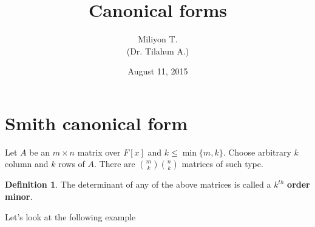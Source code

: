 \documentclass{article}
\theoremstyle{definition}
\newtheorem{defn}[thm]{Definition}
\theoremstyle{remark}
\begin{document}
\title{Canonical forms}
\author{Miliyon T.\\(Dr. Tilahun A.)}
\date{August 11, 2015}

\maketitle
\section{Smith canonical form}

Let $A$ be an $m\times n$ matrix over $F[x]$ and $k\leq\min\{m,k\}$. Choose arbitrary $k$ column and $k$ rows of $A$. There are $\binom m k \binom n k$ matrices of such type.

\begin{defn}
The determinant of any of the above matrices is called a $k^{th}$ \textbf{order minor}.
\end{defn}
Let's look at the following example
\end{document}
